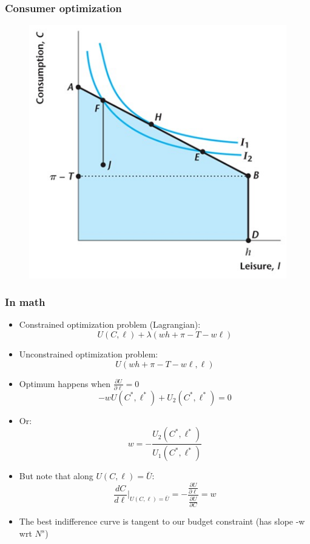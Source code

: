 \documentclass{beamer}
\begin{document}
\begin{frame}
\frametitle[alignment=center]{Consumer optimization}
\begin{figure}
\centering
\includegraphics[scale=0.5]{Figures/W_Fig_4pt5.png}
\end{figure}
\end{frame}

\begin{frame}
\frametitle[alignment=center]{In math}
\begin{itemize}
\item Constrained optimization problem (Lagrangian):
$$U(C,\ell)+\lambda(wh+\pi-T-w\ell)$$
\item Unconstrained optimization problem:
$$U(wh+\pi-T-w\ell,\ell)$$
\item Optimum happens when $\frac{\partial U}{\partial \ell}=0$
$$-wU(C^*,\ell^*)+U_2(C^*,\ell^*)=0$$
\item Or:
$$w=-\frac{U_2(C^*,\ell^*)}{U_1(C^*,\ell^*)}$$
\item But note that along $U(C,\ell)=\bar{U}$:
$$\frac{d C}{d \ell}|_{U(C,\ell)=\bar{U}}=-\frac{\frac{\partial U}{\partial \ell} }{\frac{\partial U}{\partial C}}=w$$
\item The best indifference curve is tangent to our budget constraint (has slope -w wrt $N^s$)
\end{itemize}
\end{frame}
\end{document}
